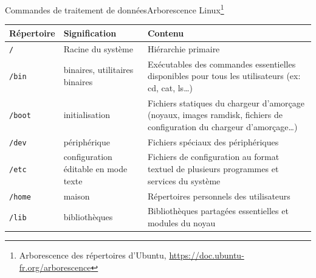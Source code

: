 \documentclass{beamer}
\begin{document}
    \begin{frame}{Commandes de traitement de données}{Arborescence Linux\footnote{\label{arborescence-linux}Arborescence des répertoires d’Ubuntu, \url{https://doc.ubuntu-fr.org/arborescence}}}
        \begin{tiny}
            \begin{table}[h!]
                \centering
                \begin{tabular}{|l|p{3cm}|p{6cm}|}
                    \hline
                    \textbf{Répertoire} & \textbf{Signification}               & \textbf{Contenu}                                                                                                               \\
                    \hline
                    \lstinline{/}       & Racine du système                    & Hiérarchie primaire                                                                                                            \\
                    \hline
                    \lstinline{/bin}    & binaires, utilitaires binaires       & Exécutables des commandes essentielles disponibles pour tous les utilisateurs (ex: cd, cat, ls…)                               \\
                    \hline
                    \lstinline{/boot}   & initialisation                       & Fichiers statiques du chargeur d’amorçage (noyaux, images ramdisk, fichiers de configuration du chargeur d'amorçage…)          \\
                    \hline
                    \lstinline{/dev}    & périphérique                         & Fichiers spéciaux des périphériques                                                                                            \\
                    \hline
                    \lstinline{/etc}    & configuration éditable en mode texte & Fichiers de configuration au format textuel de plusieurs programmes et services du système                                     \\
                    \hline
                    \lstinline{/home}   & maison                               & Répertoires personnels des utilisateurs                                                                                        \\
                    \hline
                    \lstinline{/lib}    & bibliothèques                        & Bibliothèques partagées essentielles et modules du noyau                                                                       \\

\end{tabular}
\end{table}
\end{tiny}
\end{frame}
\end{document}
